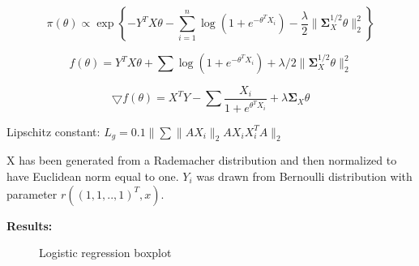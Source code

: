 \documentclass[a4paper]{article}
\begin{document}
\[ \pi(\theta) \propto \exp \left\{ -Y^TX\theta - \sum_{i=1}^n\log (1 + e^{-\theta^T X_i}) - \frac{\lambda}{2} \| \mathbf{\Sigma}_X^{1/2}\theta\|_2^2\right\}\]

\[f(\theta) = Y^T X \theta + \sum \log (1 + e^{-\theta^T X_i}) + \lambda/2 \| \mathbf{\Sigma}_X^{1/2}\theta\|_2^2\]

\[\bigtriangledown f(\theta) = X^TY - \sum \frac{X_i}{1 + e^{\theta^T X_i}} + \lambda \mathbf{\Sigma}_X\theta \]



Lipschitz constant: $L_g = 0.1 \|\sum \|AX_i \|_2 AX_iX_i^TA \|_2$

X has been generated from a Rademacher distribution and then normalized to have Euclidean norm equal to one. $Y_i$ was drawn from Bernoulli distribution with parameter $r((1,1,..,1)^T, x)$.

\textbf{Results:}

\begin{figure}[h]
\centering
{}
\qquad
{}
\caption{Logistic regression boxplot}
\end{figure}
\end{document}
